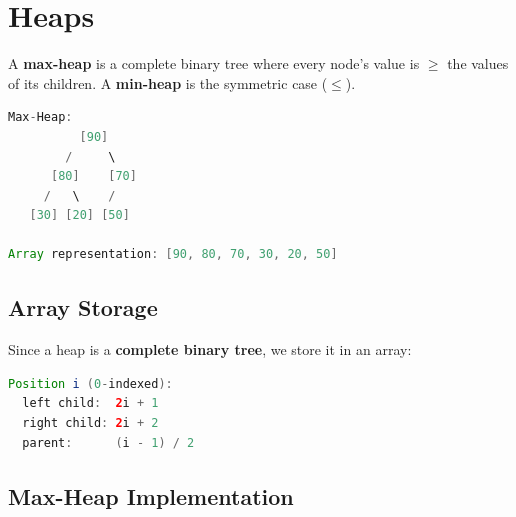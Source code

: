 \section{Heaps}

A \textbf{max-heap} is a complete binary tree where every node's value is $\ge $ the values of its children. A \textbf{min-heap} is the symmetric case ($\le $).

\begin{lstlisting}[language=Java]
Max-Heap:
          [90]
        /     \
      [80]    [70]
     /   \    /
   [30] [20] [50]

Array representation: [90, 80, 70, 30, 20, 50]
\end{lstlisting}

\subsection{Array Storage}

Since a heap is a \textbf{complete binary tree}, we store it in an array:

\begin{lstlisting}[language=Java]
Position i (0-indexed):
  left child:  2i + 1
  right child: 2i + 2
  parent:      (i - 1) / 2
\end{lstlisting}

\subsection{Max-Heap Implementation}

